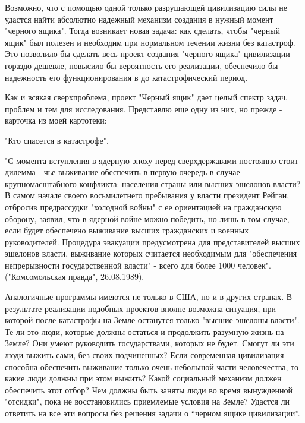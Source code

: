 \documentclass[11pt,a4paper]{article}
\begin{document}
Возможно, что с помощью одной только разрушающей цивилизацию силы не удастся
найти абсолютно надежный механизм создания в нужный момент "черного
ящика". Тогда возникает новая задача: как сделать, чтобы "черный ящик" был
полезен и необходим при нормальном течении жизни без катастроф. Это позволило
бы сделать весь проект создания "черного ящика" цивилизации гораздо дешевле,
повысило бы вероятность его реализации, обеспечило бы надежность его
функционирования в до катастрофический период.

Как и всякая сверхпроблема, проект "Черный ящик" дает целый спектр задач,
проблем и тем для исследования. Представлю еще одну из них, но прежде -
карточка из моей картотеки:

"Кто спасется в катастрофе".

"С момента вступления в ядерную эпоху перед сверхдержавами постоянно стоит
дилемма - чье выживание обеспечить в первую очередь в случае крупномасштабного
конфликта: населения страны или высших эшелонов власти? В самом начале своего
восьмилетнего пребывания у власти президент Рейган, отбросив предрассудки
"холодной войны" с ее ориентацией на гражданскую оборону, заявил, что в
ядерной войне можно победить, но лишь в том случае, если будет обеспечено
выживание высших гражданских и  военных руководителей. Процедура эвакуации
предусмотрена для представителей высших эшелонов власти, выживание которых
считается необходимым для "обеспечения непрерывности государственной власти" -
всего для более 1000 человек".  ("Комсомольская правда", 26.08.1989).

Аналогичные программы имеются не только в США, но и в других странах. В
результате реализации подобных проектов вполне возможна ситуация, при которой
после катастрофы на Земле останутся только "высшие эшелоны власти". Те ли это
люди, которые должны остаться и продолжить разумную жизнь на Земле? Они умеют
руководить государствами, которых не будет. Смогут ли эти люди выжить сами,
без своих подчиненных? Если современная цивилизация способна обеспечить
выживание только очень небольшой части человечества, то какие люди должны при
этом выжить? Какой социальный механизм должен обеспечить этот отбор? Чем
должны быть заняты люди во время вынужденной "отсидки", пока не восстановились
приемлемые условия на Земле? Удастся ли ответить на все эти вопросы без
решения задачи о “черном ящике цивилизации”.
\end{document}
